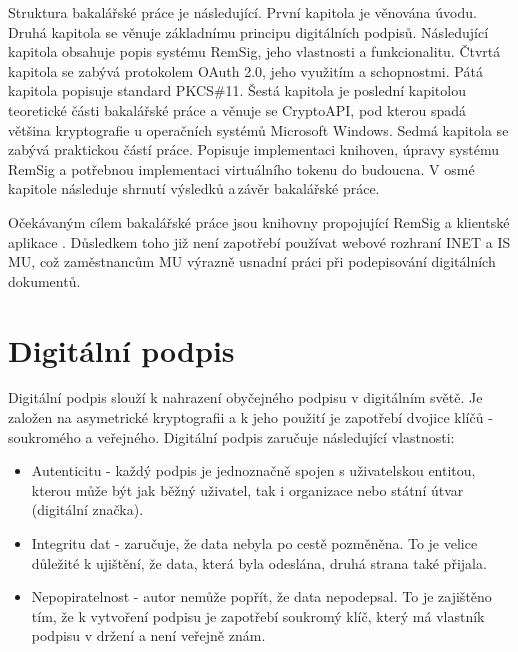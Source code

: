 \documentclass[]{fithesis3}
\begin{document}
Struktura bakalářské práce je následující. První kapitola je věnována úvodu. Druhá kapitola se věnuje základnímu principu digitálních podpisů. Následující kapitola obsahuje popis systému RemSig, jeho vlastnosti a funkcionalitu. Čtvrtá kapitola se zabývá protokolem OAuth 2.0, jeho využitím a schopnostmi. Pátá kapitola popisuje standard PKCS\#11. Šestá kapitola je poslední kapitolou teoretické části bakalářské práce a věnuje se CryptoAPI, pod kterou spadá většina kryptografie u operačních systémů Microsoft Windows. Sedmá kapitola se zabývá praktickou částí práce. Popisuje implementaci knihoven, úpravy systému RemSig a potřebnou implementaci virtuálního tokenu do budoucna. V osmé kapitole následuje shrnutí výsledků a\,závěr bakalářské práce.

Očekávaným cílem bakalářské práce jsou knihovny propojující RemSig a klientské aplikace . Důsledkem toho již není zapotřebí používat webové rozhraní INET a IS MU, což zaměstnancům MU výrazně usnadní práci při podepisování digitálních dokumentů. 


\chapter{Digitální podpis}

Digitální podpis slouží k nahrazení obyčejného podpisu v digitálním světě. Je založen na asymetrické kryptografii a k jeho použití je zapotřebí dvojice klíčů - soukromého a veřejného. Digitální podpis zaručuje následující vlastnosti:
\begin{itemize}
\item Autenticitu - každý podpis je jednoznačně spojen s uživatelskou entitou, kterou může být jak běžný uživatel, tak i organizace nebo státní útvar (digitální značka).
\item Integritu dat - zaručuje, že data nebyla po cestě pozměněna. To je velice důležité k ujištění, že data, která byla odeslána, druhá strana také přijala.
\item Nepopiratelnost - autor nemůže popřít, že data nepodepsal. To je zajištěno tím, že k vytvoření podpisu je zapotřebí soukromý klíč, který má vlastník podpisu v držení a není veřejně znám.
\end{itemize} 
\end{document}
